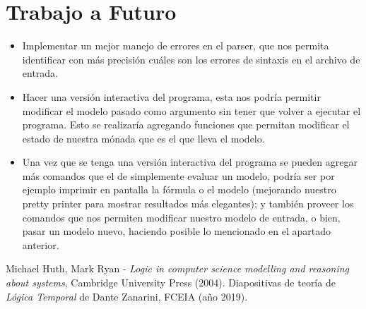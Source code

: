 \documentclass[11pt]{article}
\begin{document}
\section{Trabajo a Futuro}

\begin{itemize}
  \item Implementar un mejor manejo de errores en el parser, que nos permita 
  identificar con más precisión cuáles son los errores de sintaxis en el archivo
  de entrada.
  \item Hacer una versión interactiva del programa, esta nos podría permitir
  modificar el modelo pasado como argumento sin tener que volver a ejecutar el
  programa. Esto se realizaría agregando funciones que permitan modificar el 
  estado de nuestra mónada que es el que lleva el modelo.
  \item Una vez que se tenga una versión interactiva del programa se pueden
  agregar más comandos que el de simplemente evaluar un modelo, podría ser por
  ejemplo imprimir en pantalla la fórmula o el modelo (mejorando nuestro pretty
  printer para mostrar resultados más elegantes); y también proveer los comandos
  que nos permiten modificar nuestro modelo de entrada, o bien, pasar un modelo nuevo,
  haciendo posible lo mencionado en el apartado anterior.
\end{itemize}

\newpage

\begin{thebibliography}{9}
  Michael Huth, Mark Ryan - \emph{Logic in computer science modelling and reasoning 
  about systems}, Cambridge University Press (2004).
  Diapositivas de teoría de \emph{Lógica Temporal} de Dante Zanarini, FCEIA (año 2019).
\end{thebibliography}
\end{document}
